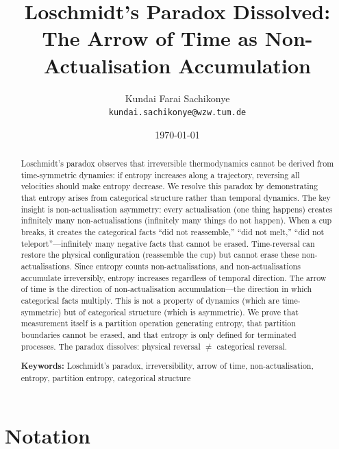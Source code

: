 \documentclass[twocolumn,10pt]{article}
\title{\textbf{Loschmidt's Paradox Dissolved: The Arrow of Time as Non-Actualisation Accumulation}}
\author{Kundai Farai Sachikonye\\
\texttt{kundai.sachikonye@wzw.tum.de}}
\date{\today}
\theoremstyle{definition}
\theoremstyle{remark}
\begin{document}
\maketitle

\begin{abstract}
Loschmidt's paradox observes that irreversible thermodynamics cannot be derived from time-symmetric dynamics: if entropy increases along a trajectory, reversing all velocities should make entropy decrease. We resolve this paradox by demonstrating that entropy arises from categorical structure rather than temporal dynamics. The key insight is non-actualisation asymmetry: every actualisation (one thing happens) creates infinitely many non-actualisations (infinitely many things do not happen). When a cup breaks, it creates the categorical facts ``did not reassemble,'' ``did not melt,'' ``did not teleport''---infinitely many negative facts that cannot be erased. Time-reversal can restore the physical configuration (reassemble the cup) but cannot erase these non-actualisations. Since entropy counts non-actualisations, and non-actualisations accumulate irreversibly, entropy increases regardless of temporal direction. The arrow of time is the direction of non-actualisation accumulation---the direction in which categorical facts multiply. This is not a property of dynamics (which are time-symmetric) but of categorical structure (which is asymmetric). We prove that measurement itself is a partition operation generating entropy, that partition boundaries cannot be erased, and that entropy is only defined for terminated processes. The paradox dissolves: physical reversal $\neq$ categorical reversal.

\textbf{Keywords:} Loschmidt's paradox, irreversibility, arrow of time, non-actualisation, entropy, partition entropy, categorical structure
\end{abstract}

\section*{Notation}
\end{document}
